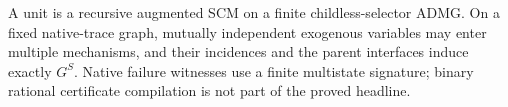 A unit is a recursive augmented SCM on a finite childless-selector ADMG. On a fixed native-trace graph, mutually independent exogenous variables may enter multiple mechanisms, and their incidences and the parent interfaces induce exactly \(G^S\). Native failure witnesses use a finite multistate signature; binary rational certificate compilation is not part of the proved headline.